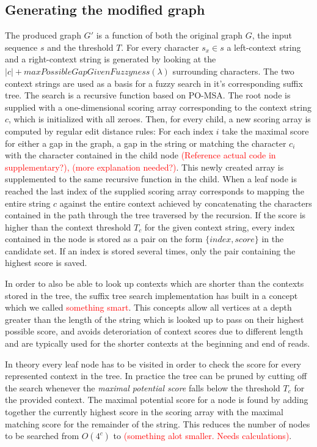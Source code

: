 \documentclass[thesis.tex]{subfiles}
\begin{document}
\subsection{Generating the modified graph}
The produced graph $G'$ is a function of both the original graph $G$, the input sequence $s$ and the threshold $T$. For every character $s_x \in s$ a left-context string and a right-context string is generated by looking at the $|c| + maxPossibleGapGivenFuzzyness(\lambda)$ surrounding characters. The two context strings are used as a basis for a fuzzy search in it's corresponding suffix tree. The search is a recursive function based on PO-MSA. The root node is supplied with a one-dimensional scoring array corresponding to the context string $c$, which is initialized with all zeroes. Then, for every child, a new scoring array is computed by regular edit distance rules: For each index $i$ take the maximal score for either a gap in the graph, a gap in the string or matching the character $c_i$ with the character contained in the child node \textcolor{red}{(Reference actual code in supplementary?), (more explanation needed?)}. This newly created array is supplemented to the same recursive function in the child. When a leaf node is reached the last index of the supplied scoring array corresponds to mapping the entire string $c$ against the entire context achieved by concatenating the characters contained in the path through the tree traversed by the recursion. If the score is higher than the context threshold $T_c$ for the given context string, every index contained in the node is stored as a pair on the form $\{index, score\}$ in the candidate set. If an index is stored several times, only the pair containing the highest score is saved.\\
\par\noindent
In order to also be able to look up contexts which are shorter than the contexts stored in the tree, the suffix tree search implementation has built in a concept which we called \textcolor{red}{something smart}. This concepts allow all vertices at a depth greater than the length of the string which is looked up to pass on their highest possible score, and avoids deteroriation of context scores due to different length and are typically used for the shorter contexts at the beginning and end of reads.\\
\par\noindent
In theory every leaf node has to be visited in order to check the score for every represented context in the tree. In practice the tree can be pruned by cutting off the search whenever the \textit{maximal potential score} falls below the threshold $T_c$ for the provided context. The maximal potential score for a node is found by adding together the currently highest score in the scoring array with the maximal matching score for the remainder of the string. This reduces the number of nodes to be searched from $O(4^c)$ to \textcolor{red}{(something alot smaller. Needs calculations)}.\\
\end{document}
